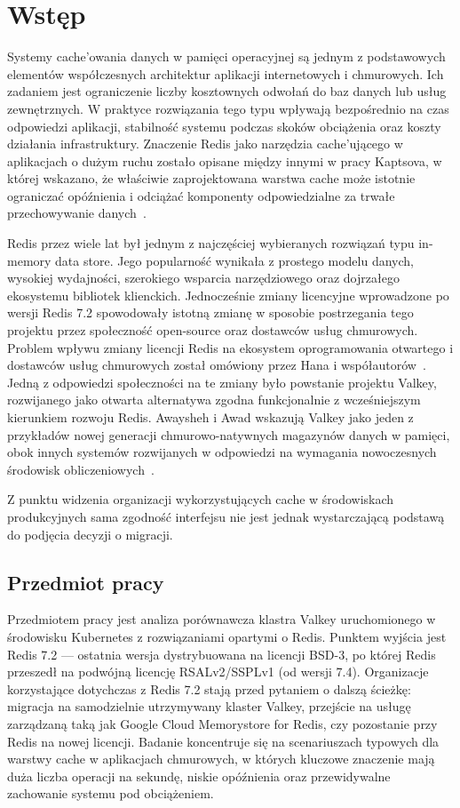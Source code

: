 \chapter{Wstęp}\label{ch:wstep}

Systemy cache'owania danych w pamięci operacyjnej są jednym z podstawowych elementów współczesnych architektur aplikacji internetowych i chmurowych. Ich zadaniem jest ograniczenie liczby kosztownych odwołań do baz danych lub usług zewnętrznych. W praktyce rozwiązania tego typu wpływają bezpośrednio na czas odpowiedzi aplikacji, stabilność systemu podczas skoków obciążenia oraz koszty działania infrastruktury. Znaczenie Redis jako narzędzia cache'ującego w aplikacjach o dużym ruchu zostało opisane między innymi w pracy Kaptsova, w której wskazano, że właściwie zaprojektowana warstwa cache może istotnie ograniczać opóźnienia i odciążać komponenty odpowiedzialne za trwałe przechowywanie danych~\cite{kaptosv2025}.

Redis przez wiele lat był jednym z najczęściej wybieranych rozwiązań typu in-memory data store. Jego popularność wynikała z prostego modelu danych, wysokiej wydajności, szerokiego wsparcia narzędziowego oraz dojrzałego ekosystemu bibliotek klienckich. Jednocześnie zmiany licencyjne wprowadzone po wersji Redis 7.2 spowodowały istotną zmianę w sposobie postrzegania tego projektu przez społeczność open-source oraz dostawców usług chmurowych. Problem wpływu zmiany licencji Redis na ekosystem oprogramowania otwartego i dostawców usług chmurowych został omówiony przez Hana i współautorów~\cite{han2026}. Jedną z odpowiedzi społeczności na te zmiany było powstanie projektu Valkey, rozwijanego jako otwarta alternatywa zgodna funkcjonalnie z wcześniejszym kierunkiem rozwoju Redis. Awaysheh i Awad wskazują Valkey jako jeden z przykładów nowej generacji chmurowo-natywnych magazynów danych w pamięci, obok innych systemów rozwijanych w odpowiedzi na wymagania nowoczesnych środowisk obliczeniowych~\cite{awaysheh2025}.

Z punktu widzenia organizacji wykorzystujących cache w środowiskach produkcyjnych sama zgodność interfejsu nie jest jednak wystarczającą podstawą do podjęcia decyzji o migracji. 
\section{Przedmiot pracy}

Przedmiotem pracy jest analiza porównawcza klastra Valkey uruchomionego w środowisku Kubernetes z rozwiązaniami opartymi o Redis. Punktem wyjścia jest Redis 7.2 --- ostatnia wersja dystrybuowana na licencji BSD-3, po której Redis przeszedł na podwójną licencję RSALv2/SSPLv1 (od wersji 7.4). Organizacje korzystające dotychczas z Redis 7.2 stają przed pytaniem o dalszą ścieżkę: migracja na samodzielnie utrzymywany klaster Valkey, przejście na usługę zarządzaną taką jak Google Cloud Memorystore for Redis, czy pozostanie przy Redis na nowej licencji. Badanie koncentruje się na scenariuszach typowych dla warstwy cache w aplikacjach chmurowych, w których kluczowe znaczenie mają duża liczba operacji na sekundę, niskie opóźnienia oraz przewidywalne zachowanie systemu pod obciążeniem.

